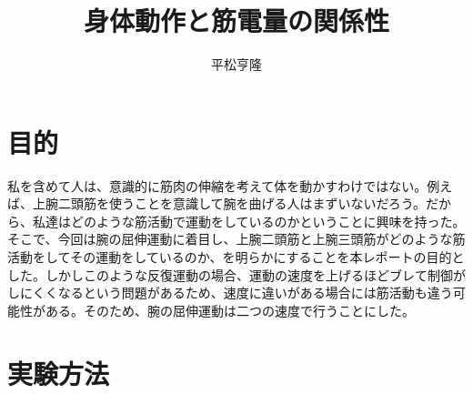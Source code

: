 \documentclass{jsarticle}
\begin{document}
\title{身体動作と筋電量の関係性}
\author{平松亨隆}
\maketitle


\section{目的}
私を含めて人は、意識的に筋肉の伸縮を考えて体を動かすわけではない。例えば、上腕二頭筋を使うことを意識して腕を曲げる人はまずいないだろう。だから、私達はどのような筋活動で運動をしているのかということに興味を持った。そこで、今回は腕の屈伸運動に着目し、上腕二頭筋と上腕三頭筋がどのような筋活動をしてその運動をしているのか、を明らかにすることを本レポートの目的とした。しかしこのような反復運動の場合、運動の速度を上げるほどブレて制御がしにくくなるという問題があるため、速度に違いがある場合には筋活動も違う可能性がある。そのため、腕の屈伸運動は二つの速度で行うことにした。

\section{実験方法}
\end{document}
